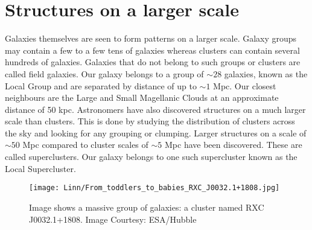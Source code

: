 \documentclass{../template/texnote}
\begin{document}
\section{Structures on a larger scale}
Galaxies themselves are seen to form patterns on a larger scale. Galaxy groups may contain a few to a few tens of galaxies whereas clusters can contain several hundreds of galaxies.
Galaxies that do not belong to such groups or clusters are called field galaxies.
Our galaxy belongs to a group of $\sim 28$ galaxies, known as the Local Group and are separated by distance of up to $\sim1$ Mpc. Our closest neighbours are the Large and Small Magellanic Clouds at an approximate distance of 50 kpc.
Astronomers have also discovered structures on a much larger scale than clusters. This is done by studying the distribution of clusters across the sky and looking for any grouping or clumping. Larger structures on a scale of $\sim50$ Mpc compared to cluster scales of $\sim5$ Mpc have been discovered. These are called superclusters. Our galaxy belongs to one such supercluster known as the Local Supercluster.
	\begin{figure}
	\begin{center}
		\texttt{[image: Linn/From\_toddlers\_to\_babies\_RXC\_J0032.1+1808.jpg]}
	\end{center}
	\caption{Image shows a massive group of galaxies: a cluster named RXC J0032.1+1808. Image Courtesy: ESA/Hubble}
	\label{fig:cluster}
	\end{figure}

    \printbibliography
\end{document}
